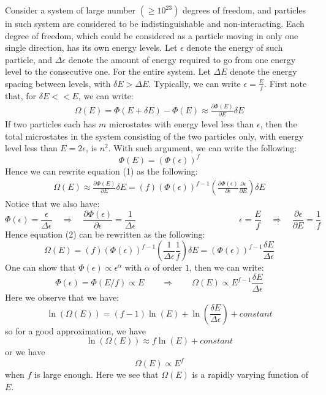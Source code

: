 \documentclass[11pt]{article}
\theoremstyle{break}
\theoremstyle{break}
\begin{document}
Consider a system of large number $(\geq 10^{23})$ degrees of freedom, and particles in such system are considered to be indistinguishable and non-interacting. Each degree of freedom, which could be considered as a particle moving in only one single direction, has its own energy levels. Let $\epsilon$ denote the energy of such particle, and $\Delta \epsilon$ denote the amount of energy required to go from one energy level to the consecutive one. For the entire system. Let $\Delta E$ denote the energy spacing between levels, with $\delta E > \Delta E$. Typically, we can write $\epsilon = \frac{E}{f}$. First note that, for $\delta E <<E$, we can write:
\begin{align*}
\Omega(E) = \Phi(E+\delta E) - \Phi(E) \approx \frac{\partial \Phi(E)}{\partial E}\delta E \tag{1}
\end{align*}
If two particles each has $m$ microstates with energy level less than $\epsilon$, then the total microstates in the system consisting of the two particles only, with energy level less than $E = 2\epsilon$, is $n^2$. With such argument, we can write the following:
$$\Phi(E) = \left(\Phi(\epsilon)\right)^f$$
Hence we can rewrite equation (1) as the following:
\begin{align*}
\Omega(E) \approx \frac{\partial \Phi(E)}{\partial E}\delta E =  (f)(\Phi(\epsilon))^{f-1}\left(\frac{\partial \Phi(\epsilon)}{\partial \epsilon}\frac{\partial \epsilon}{\partial E}\right) \delta E \tag{2}
\end{align*}
Notice that we also have:
$$\Phi(\epsilon) = \frac{\epsilon}{\Delta \epsilon} \quad \Rightarrow \quad \frac{\partial \Phi(\epsilon)}{\partial \epsilon} = \frac{1}{\Delta \epsilon}\qquad\qquad\qquad\qquad\qquad\qquad \epsilon = \frac{E}{f}\quad \Rightarrow \quad \frac{\partial \epsilon}{\partial E} = \frac{1}{f}$$
Hence equation (2) can be rewritten as the following:
$$\Omega(E)  = (f)(\Phi(\epsilon))^{f-1}\left( \frac{1}{\Delta \epsilon}\frac{1}{f}\right) \delta E = (\Phi(\epsilon))^{f-1} \frac{\delta E}{\Delta \epsilon}$$
One can show that $\Phi(\epsilon) \propto \epsilon^\alpha$ with $\alpha$ of order $1$, then we can write: 
$$\Phi(\epsilon) = \Phi(E/f) \propto E \qquad \Rightarrow \qquad \Omega(E) \propto E^{f-1} \frac{\delta E}{\Delta \epsilon}$$
Here we observe that we have: 
$$\ln(\Omega(E)) = (f-1)\ln (E) + \ln \left( \frac{\delta E}{\Delta \epsilon}\right) + constant$$
so for a good approximation, we have
$$\ln(\Omega(E)) \approx f\ln(E) + constant$$
or we have 
$$\Omega(E) \propto E^f$$
when $f$ is large enough. Here we see that $\Omega(E)$ is a rapidly varying function of $E$.
\end{document}
